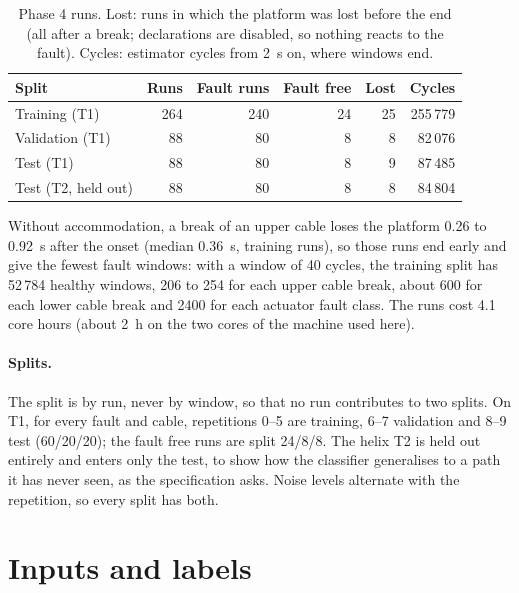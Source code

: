 \documentclass[10pt]{article}
\begin{document}
\begin{table}[h]
\centering\small
\caption{Phase 4 runs. Lost: runs in which the platform was lost before the end (all after a break; declarations are disabled, so nothing reacts to the fault). Cycles: estimator cycles from 2~s on, where windows end.}\label{tab:data}
\begin{tabular}{@{}lrrrrr@{}}
\toprule
Split & Runs & Fault runs & Fault free & Lost & Cycles \\
\midrule
Training (T1) & 264 & 240 & 24 & 25 & 255\,779 \\
Validation (T1) & 88 & 80 & 8 & 8 & 82\,076 \\
Test (T1) & 88 & 80 & 8 & 9 & 87\,485 \\
Test (T2, held out) & 88 & 80 & 8 & 8 & 84\,804 \\
\bottomrule
\end{tabular}
\end{table}

Without accommodation, a break of an upper cable loses the platform 0.26 to 0.92~s after the onset (median 0.36~s, training runs), so those runs end early and give the fewest fault windows: with a window of 40 cycles, the training split has 52\,784 healthy windows, 206 to 254 for each upper cable break, about 600 for each lower cable break and 2400 for each actuator fault class. The runs cost 4.1 core hours (about 2~h on the two cores of the machine used here).

\paragraph{Splits.} The split is by run, never by window, so that no run contributes to two splits. On T1, for every fault and cable, repetitions 0--5 are training, 6--7 validation and 8--9 test (60/20/20); the fault free runs are split 24/8/8. The helix T2 is held out entirely and enters only the test, to show how the classifier generalises to a path it has never seen, as the specification asks. Noise levels alternate with the repetition, so every split has both.

\section{Inputs and labels}\label{sec:inputs}
\end{document}
